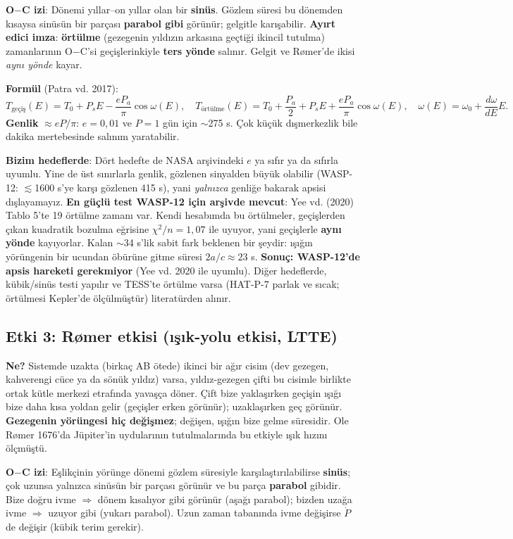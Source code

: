 \textbf{O$-$C izi}: Dönemi yıllar–on yıllar olan bir \textbf{sinüs}. Gözlem süresi bu dönemden kısaysa sinüsün bir
parçası \textbf{parabol gibi} görünür; gelgitle karışabilir. \textbf{Ayırt edici imza}: \textbf{örtülme} (gezegenin
yıldızın arkasına geçtiği ikincil tutulma) zamanlarının O$-$C'si geçişlerinkiyle \textbf{ters yönde} salınır.
Gelgit ve Rømer'de ikisi \emph{aynı yönde} kayar.

\textbf{Formül} (Patra vd. 2017):
\[
T_\text{geçiş}(E) = T_0 + P_s E - \frac{e P_a}{\pi}\cos\omega(E),\quad
T_\text{örtülme}(E) = T_0 + \frac{P_a}{2} + P_s E + \frac{e P_a}{\pi}\cos\omega(E),\quad
\omega(E) = \omega_0 + \frac{d\omega}{dE}E .
\]
\textbf{Genlik} $\approx eP/\pi$: $e = 0{,}01$ ve $P = 1$ gün için $\sim$275 s. Çok küçük dışmerkezlik bile dakika
mertebesinde salınım yaratabilir.

\textbf{Bizim hedeflerde}: Dört hedefte de NASA arşivindeki $e$ ya sıfır ya da sıfırla uyumlu. Yine de üst sınırlarla
genlik, gözlenen sinyalden büyük olabilir (WASP-12: $\lesssim$1600 s'ye karşı gözlenen 415 s), yani \emph{yalnızca}
genliğe bakarak apsisi dışlayamayız. \textbf{En güçlü test WASP-12 için arşivde mevcut}: Yee vd. (2020) Tablo 5'te 19
örtülme zamanı var. Kendi hesabımda bu örtülmeler, geçişlerden çıkan kuadratik bozulma eğrisine $\chi^2/n = 1{,}07$
ile uyuyor, yani geçişlerle \textbf{aynı yönde} kayıyorlar. Kalan $\sim$34 s'lik sabit fark beklenen bir
şeydir: ışığın yörüngenin bir ucundan öbürüne gitme süresi $2a/c \approx 23$ s. \textbf{Sonuç: WASP-12'de apsis
hareketi gerekmiyor} (Yee vd. 2020 ile uyumlu). Diğer hedeflerde, kübik/sinüs testi yapılır ve TESS'te örtülme varsa
(HAT-P-7 parlak ve sıcak; örtülmesi Kepler'de ölçülmüştür) literatürden alınır.

\subsection{Etki 3: Rømer etkisi (ışık-yolu etkisi, LTTE)}
\textbf{Ne?} Sistemde uzakta (birkaç AB ötede) ikinci bir ağır cisim (dev gezegen, kahverengi cüce ya da sönük yıldız)
varsa, yıldız-gezegen çifti bu cisimle birlikte ortak kütle merkezi etrafında yavaşça döner. Çift bize yaklaşırken
geçişin ışığı bize daha kısa yoldan gelir (geçişler erken görünür); uzaklaşırken geç görünür. \textbf{Gezegenin yörüngesi
hiç değişmez}; değişen, ışığın bize gelme süresidir. Ole Rømer 1676'da Jüpiter'in uydularının tutulmalarında bu etkiyle
ışık hızını ölçmüştü.

\textbf{O$-$C izi}: Eşlikçinin yörünge dönemi gözlem süresiyle karşılaştırılabilirse \textbf{sinüs}; çok uzunsa
yalnızca sinüsün bir parçası görünür ve bu parça \textbf{parabol} gibidir. Bize doğru ivme $\Rightarrow$ dönem kısalıyor
gibi görünür (aşağı parabol); bizden uzağa ivme $\Rightarrow$ uzuyor gibi (yukarı parabol). Uzun zaman tabanında ivme
değişirse $\dot P$ de değişir (kübik terim gerekir).

